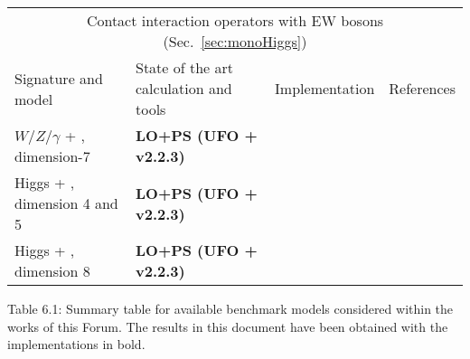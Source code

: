 \begin{footnotesize}
\begin{table*}[!p]
\begin{tabular}{llrl}
	\cmidrule(r){1-4} 
	\multicolumn{4}{c}{Contact interaction operators with EW bosons (Sec.~\ref{sec:monoHiggs})}\\
	\cmidrule(r){1-4} 
	Signature and model & State of the art calculation and tools & Implementation & References \\ 
	\cmidrule(r){1-4} 
	
	 $W/Z/\gamma$ + \MET{}, dimension-7& \textbf{LO+PS (UFO + \madgraph v2.2.3)} & \cite{ForumSVN_EWEFTD7}& \parbox{4cm} {\cite{Cotta:2012nj, Carpenter:2012rg, Crivellin:2015wva,Berlin:2014cfa,Alwall:2014hca,Alloul:2013bka,Degrande:2011ua} }\\ 
	 Higgs + \MET{}, dimension 4 and 5 & \textbf{LO+PS (UFO + \madgraph v2.2.3)} & \cite{ForumSVN_monoHEFTD5}& \parbox{4cm} {\cite{Carpenter:2013xra,Petrov:2013nia,Berlin:2014cfa,Alwall:2014hca,Alloul:2013bka,Degrande:2011ua} }\\ 
	 Higgs + \MET{}, dimension 8 & \textbf{LO+PS (UFO + \madgraph v2.2.3)} & \cite{ForumSVN_EWMonoHiggs}&
	 \parbox{4cm} {\cite{Carpenter:2013xra,Petrov:2013nia,Berlin:2014cfa,Alwall:2014hca,Alloul:2013bka,Degrande:2011ua} }\\ 

	
	\bottomrule 
	\end{tabular}
	
	\begin{center}
		\normalsize 
		Table 6.1: 
		Summary table for available benchmark models considered within the works of this Forum. 
		The results in this document have been obtained with the implementations in bold. 	
		\label{tab:summaryModels}
	\end{center}
	
\end{table*}

\end{footnotesize}


